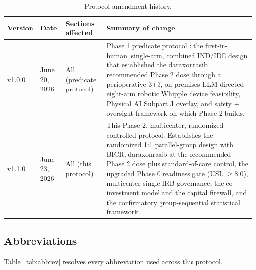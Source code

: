 \begin{table}[htbp]
\centering
\footnotesize
\caption{Protocol amendment history.}
\label{tab:amend}
\begin{tabularx}{\textwidth}{L{2.0cm} L{2.6cm} L{3.2cm} Y}
\toprule
\textbf{Version} & \textbf{Date} & \textbf{Sections affected} & \textbf{Summary of change} \\
\midrule
v1.0.0 & June 20, 2026 & All (predicate protocol) & Phase 1 predicate protocol \cite{kawchak2026phase1}: the first-in-human, single-arm, combined IND/IDE design that established the daraxonrasib recommended Phase 2 dose through a perioperative 3+3, on-premises LLM-directed eight-arm robotic Whipple device feasibility, Physical AI Subpart J overlay, and safety + oversight framework on which Phase 2 builds. \\
v1.1.0 & June 23, 2026 & All (this protocol) & This Phase 2, multicenter, randomized, controlled protocol. Establishes the randomized 1:1 parallel-group design with BICR, daraxonrasib at the recommended Phase 2 dose plus standard-of-care control, the upgraded Phase 0 readiness gate (USL $\geq 8.0$), multicenter single-IRB governance, the co-investment model and the capital firewall, and the confirmatory group-sequential statistical framework. \\
\bottomrule
\end{tabularx}
\end{table}

\clearpage

\subsection{Abbreviations}

Table~\ref{tab:abbrev} resolves every abbreviation used across this protocol.


